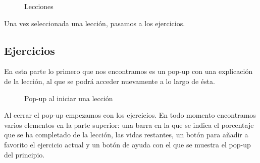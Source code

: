 \begin{figure}[H]
\begin{center}
\caption{Lecciones\label{fig:lecciones}}
\end{center}
\end{figure}

Una vez seleccionada una lección, pasamos a los ejercicios.

\subsection{Ejercicios}

En esta parte lo primero que nos encontramos es un pop-up con una explicación de la lección, al que se podrá acceder nuevamente a lo largo de ésta. 

\begin{figure}[H]
\begin{center}
\caption{Pop-up al iniciar una lección\label{fig:popup}}
\end{center}
\end{figure}

Al cerrar el pop-up empezamos con los ejercicios. En todo momento encontramos varios elementos en la parte superior: una barra en la que se indica el porcentaje que se ha completado de la lección, las vidas restantes, un botón para añadir a favorito el ejercicio actual y un botón de ayuda con el que se muestra el pop-up del principio.

